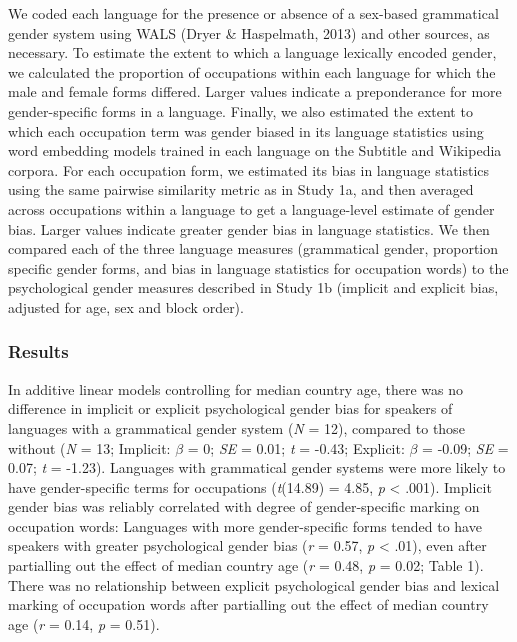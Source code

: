 \documentclass[man,floatsintext]{apa6}
\begin{document}
We coded each language for the presence or absence of a sex-based grammatical gender system using WALS (Dryer \& Haspelmath, 2013) and other sources, as necessary. To estimate the extent to which a language lexically encoded gender, we calculated the proportion of occupations within each language for which the male and female forms differed. Larger values indicate a preponderance for more gender-specific forms in a language. Finally, we also estimated the extent to which each occupation term was gender biased in its language statistics using word embedding models trained in each language on the Subtitle and Wikipedia corpora. For each occupation form, we estimated its bias in language statistics using the same pairwise similarity metric as in Study 1a, and then averaged across occupations within a language to get a language-level estimate of gender bias. Larger values indicate greater gender bias in language statistics. We then compared each of the three language measures (grammatical gender, proportion specific gender forms, and bias in language statistics for occupation words) to the psychological gender measures described in Study 1b (implicit and explicit bias, adjusted for age, sex and block order).

\hypertarget{results-4}{%
\subsubsection{Results}\label{results-4}}

In additive linear models controlling for median country age, there was no difference in implicit or explicit psychological gender bias for speakers of languages with a grammatical gender system (\emph{N} = 12), compared to those without (\emph{N} = 13; Implicit: \(\beta\) = 0; \emph{SE} = 0.01; \emph{t} = -0.43; Explicit: \(\beta\) = -0.09; \emph{SE} = 0.07; \emph{t} = -1.23). Languages with grammatical gender systems were more likely to have gender-specific terms for occupations (\emph{t}(14.89) = 4.85, \emph{p} \textless{} .001). Implicit gender bias was reliably correlated with degree of gender-specific marking on occupation words: Languages with more gender-specific forms tended to have speakers with greater psychological gender bias (\emph{r} = 0.57, \emph{p} \textless{} .01), even after partialling out the effect of median country age (\emph{r} = 0.48, \emph{p} = 0.02; Table 1). There was no relationship between explicit psychological gender bias and lexical marking of occupation words after partialling out the effect of median country age (\emph{r} = 0.14, \emph{p} = 0.51).
\end{document}
